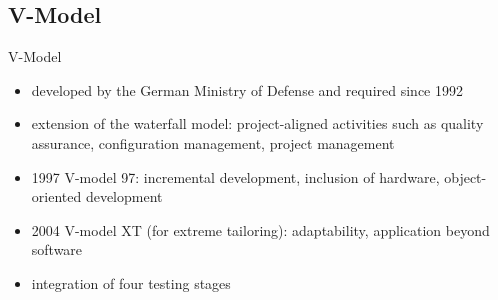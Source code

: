 
\subsection{V-Model}
\begin{frame}{\insertsubsection}
	\begin{fancycolumns}
		\begin{definition}{V-Model \mysource{\ludewiglichter}}
			\begin{itemize}
				\item developed by the German Ministry of Defense  and required since 1992
				\item extension of the waterfall model: project-aligned activities such as quality assurance, configuration management, project management
				\item 1997 V-model 97: incremental development, inclusion of hardware, object-oriented development
				\item 2004 V-model XT (for extreme tailoring): adaptability, application beyond software
				\item integration of four testing stages
			\end{itemize}
		\end{definition}
		\nextcolumn
		\diagramVModel
	\end{fancycolumns}
\end{frame}

